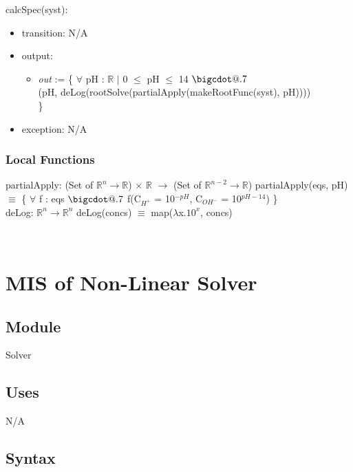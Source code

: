 \documentclass[12pt, titlepage]{article}
\makeatletter
\newcommand*\bigcdot{\mathpalette\bigcdot@{.7}}
\newcommand*\bigcdot@[2]
  {\mathbin{\vcenter{\hbox{\scalebox{#2}{$\m@th#1\bullet$}}}}}
\makeatother
\begin{document}
\noindent calcSpec(syst):
\begin{itemize}
\item transition: N/A
\item output: \begin{itemize} 
              \item[] \emph{out} := \{ $\forall$ pH : $\mathbb{R}$ $|$ 0 $\leq$ pH $\leq$ 14 $\bigcdot$\\
                \hspace*{2em}(pH, deLog(rootSolve(partialApply(makeRootFunc(syst), pH))))\\
                \}
              \end{itemize}
\item exception: N/A
\end{itemize}

\subsubsection{Local Functions}
partialApply: (Set of $\mathbb{R}^{n} \rightarrow \mathbb{R}$) $\times$ $\mathbb{R}$ $\rightarrow$ 
  (Set of $\mathbb{R}^{n - 2} \rightarrow \mathbb{R}$)
\newline partialApply(eqs, pH) $\equiv$ \{ $\forall$ f : eqs $\bigcdot$ f(C$_{H^+}$ = 10$^{-pH}$, C$_{OH^-}$ = 10$^{pH - 14}$) \}\\

\noindent deLog:  $\mathbb{R}^{n} \rightarrow \mathbb{R}^{n}$
\newline deLog(concs) $\equiv$ map($\lambda$x.$10^x$, concs)

~\newpage


\section{MIS of Non-Linear Solver} \label{Module:NLS} 

\subsection{Module}

Solver

\subsection{Uses}

N/A

\subsection{Syntax}
\end{document}
